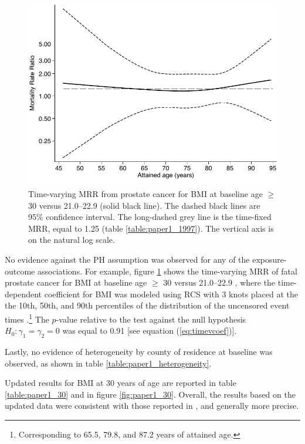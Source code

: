 \begin{figure}[t]
\centering
\includegraphics[width=.8\linewidth]{figures/tvcoef.pdf}
\caption[Time-varying Mortality Rate Ratio for BMI at baseline age $\ge$ 30 \kgmsq{}]{Time-varying MRR from prostate cancer for BMI at baseline age $\ge$ 30 \kgmsq{} versus 21.0--22.9 \kgmsq{} (solid black line). The dashed black lines are  95\% confidence interval. The long-dashed grey line is the time-fixed MRR, equal to 1.25 (table \ref{table:paper1_1997}). The vertical axis is on the natural log scale.}
\label{fig:tvcoef}
\end{figure}

No evidence against the PH assumption was observed for any of the exposure-outcome associations. For example, figure \ref{fig:tvcoef} shows the time-varying MRR of fatal prostate cancer for   BMI at baseline age $\ge$ 30 \kgmsq{} versus 21.0--22.9 \kgmsq{}, where the time-dependent coefficient for BMI was modeled using RCS with 3 knots placed at the the 10th, 50th, and 90th percentiles of the distribution of the uncensored event times \citep{discacciati_stphcoxrcs_2015}.\footnote{Corresponding to 65.5, 79.8, and 87.2 years of attained age.} The $p$-value relative to the test against the null hypothesis $H_0:\gamma_1=\gamma_2=0$ was equal to 0.91 [see equation (\ref{eq:timevcoef})].  

Lastly, no evidence of heterogeneity by county of residence at baseline  was observed, as shown in table \ref{table:paper1_heterogeneity}.

Updated results for BMI at 30 years of age are reported in table \ref{table:paper1_30} and in figure \ref{fig:paper1_30}. Overall, the results based on the updated data were consistent with those reported in , and generally more precise.

